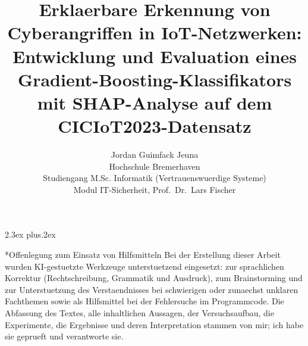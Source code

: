 \documentclass[letterpaper,twocolumn,10pt]{article}
\makeatletter
\def\section{\@startsection{section}{1}{\z@}{-3.5ex plus-1ex minus-.2ex}%
  {2.3ex plus.2ex}{\reset@font\large\bf\raggedright}}
\makeatother
\begin{document}
\date{}

\title{\Large \bf
  Erklaerbare Erkennung von Cyberangriffen in IoT-Netzwerken:\\
  Entwicklung und Evaluation eines Gradient-Boosting-Klassifikators\\
  mit SHAP-Analyse auf dem CICIoT2023-Datensatz
}

\author{
  {\rm Jordan Guimfack Jeuna}\\
  Hochschule Bremerhaven\\
  Studiengang M.Sc. Informatik (Vertrauenswuerdige Systeme)\\
  Modul IT-Sicherheit, Prof.\ Dr.\ Lars Fischer
}

\maketitle

\begin{abstract}

\end{abstract}








\section*{Offenlegung zum Einsatz von Hilfsmitteln}
Bei der Erstellung dieser Arbeit wurden KI-gestuetzte Werkzeuge unterstuetzend eingesetzt:
zur sprachlichen Korrektur (Rechtschreibung, Grammatik und Ausdruck), zum Brainstorming und
zur Unterstuetzung des Verstaendnisses bei schwierigen oder zunaechst unklaren Fachthemen sowie
als Hilfsmittel bei der Fehlersuche im Programmcode.
Die Abfassung des Textes, alle inhaltlichen Aussagen, der Versuchsaufbau, die Experimente, die
Ergebnisse und deren Interpretation stammen von mir; ich habe sie geprueft und verantworte sie.

{\footnotesize 
}
\end{document}
